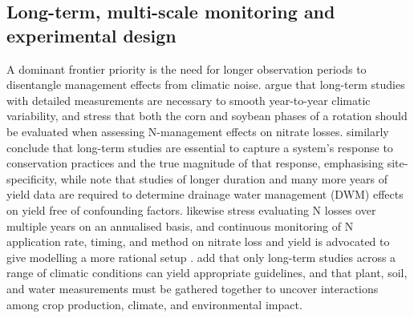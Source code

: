 \subsection{Long-term, multi-scale monitoring and experimental design}

A dominant frontier priority is the need for longer observation periods to disentangle management effects from climatic noise. \textcite{Randall2003,Randall2005} argue that long-term studies with detailed measurements are necessary to smooth year-to-year climatic variability, and stress that both the corn and soybean phases of a rotation should be evaluated when assessing N-management effects on nitrate losses. \textcite{Waring2024} similarly conclude that long-term studies are essential to capture a system's response to conservation practices and the true magnitude of that response, emphasising site-specificity, while \textcite{Cooke2012} note that studies of longer duration and many more years of yield data are required to determine drainage water management (DWM) effects on yield free of confounding factors. \textcite{Pittelkow2017} likewise stress evaluating N losses over multiple years on an annualised basis, and continuous monitoring of N application rate, timing, and method on nitrate loss and yield is advocated to give modelling a more rational setup \parencite{Jeong2018}. \textcite{RANDALL1995} add that only long-term studies across a range of climatic conditions can yield appropriate guidelines, and that plant, soil, and water measurements must be gathered together to uncover interactions among crop production, climate, and environmental impact.

